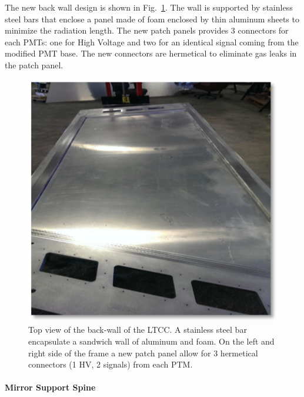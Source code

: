 The new back wall design is shown in Fig.~\ref{fig:backWall}. The wall is supported by stainless steel bars that enclose a panel made of foam enclosed by
thin aluminum sheets to minimize the radiation length.
The new patch panels provides 3 connectors for each PMTs: one for High Voltage and two for an identical signal coming from the modified PMT base.
The new connectors are hermetical to eliminate gas leaks in the patch panel.

\begin{figure}[hbt]
	\centering
	\includegraphics[width=1.0\columnwidth,keepaspectratio]{img/backWall.png}
	\caption{Top view of the back-wall of the LTCC. A stainless steel bar encapsulate a sandwich wall of aluminum and foam. On the left and right side
            of the frame a new patch panel allow for 3 hermetical connectors (1 HV, 2 signals) from each PTM. }
	\label{fig:backWall}
\end{figure}


\paragraph{Mirror Support Spine}

